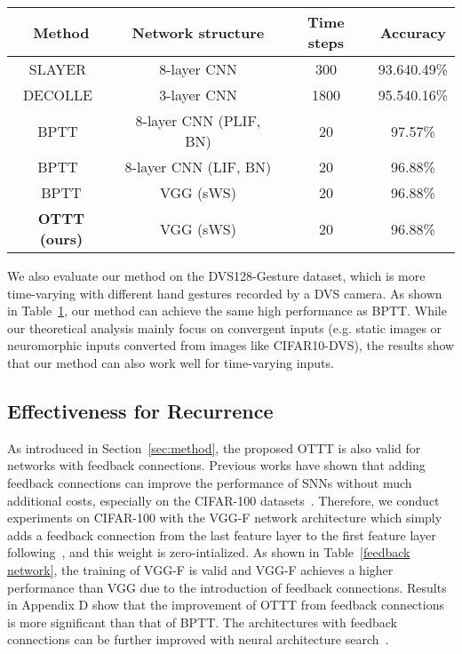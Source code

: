 \documentclass{article}
\begin{document}
\begin{table}
	\centering
	\small
	\tabcolsep=2mm
	\begin{tabular}{cccc}
		\toprule[1pt]
		Method & Network structure & Time steps & Accuracy\\
		\midrule[0.5pt]
		SLAYER~\cite{shrestha2018slayer} & 8-layer CNN & 300 & 93.640.49\%\\
		DECOLLE~\cite{kaiser2020synaptic} & 3-layer CNN & 1800 & 95.540.16\% \\
		BPTT~\cite{Fang_2021_ICCV} & 8-layer CNN (PLIF, BN) & 20 & 97.57\% \\
		BPTT~\cite{Fang_2021_ICCV} & 8-layer CNN (LIF, BN) & 20 & 96.88\% \\
		\hline
		BPTT & VGG (sWS) & 20 & 96.88\% \\
		\hline
		\textbf{OTTT (ours)} & VGG (sWS) & 20 & 96.88\%\\
		\bottomrule[1pt]
	\end{tabular}
	\label{dvs128 gesture}
    \vspace{-3mm}
\end{table}

We also evaluate our method on the DVS128-Gesture dataset, which is more time-varying with different hand gestures recorded by a DVS camera. As shown in Table~\ref{dvs128 gesture}, our method can achieve the same high performance as BPTT. While our theoretical analysis mainly focus on convergent inputs (e.g. static images or neuromorphic inputs converted from images like CIFAR10-DVS), the results show that our method can also work well for time-varying inputs.

\vspace{-2mm}
\subsection{Effectiveness for Recurrence}
\vspace{-2.5mm}
As introduced in Section~\ref{sec:method}, the proposed OTTT is also valid for networks with feedback connections. Previous works have shown that adding feedback connections can improve the performance of SNNs without much additional costs, especially on the CIFAR-100 datasets~\cite{xiao2021training,kim2022neural}. Therefore, we conduct experiments on CIFAR-100 with the VGG-F network architecture which simply adds a feedback connection from the last feature layer to the first feature layer following~\cite{xiao2021training}, and this weight is zero-intialized. As shown in Table~\ref{feedback network}, the training of VGG-F is valid and VGG-F achieves a higher performance than VGG due to the introduction of feedback connections. Results in Appendix D show that the improvement of OTTT from feedback connections is more significant than that of BPTT. The architectures with feedback connections can be further improved with neural architecture search~\cite{kim2022neural}.
\end{document}
